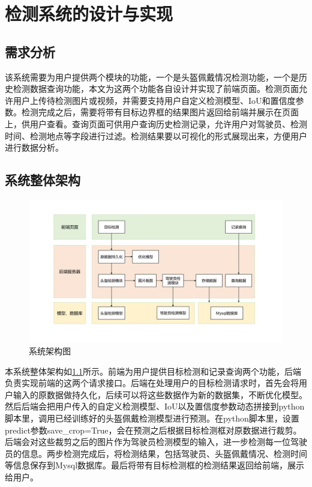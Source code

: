 \chapter{检测系统的设计与实现}

\section{需求分析}
该系统需要为用户提供两个模块的功能，一个是头盔佩戴情况检测功能，一个是历史检测数据查询功能，本文为这两个功能各自设计并实现了前端页面。检测页面允许用户上传待检测图片或视频，并需要支持用户自定义检测模型、IoU和置信度参数。检测完成之后，需要将带有目标边界框的结果图片返回给前端并展示在页面上，供用户查看。查询页面可供用户查询历史检测记录，允许用户对驾驶员、检测时间、检测地点等字段进行过滤。检测结果要以可视化的形式展现出来，方便用户进行数据分析。

\section{系统整体架构}
\begin{figure}[!htb]
    \centering
    \includegraphics[width=1\textwidth]{figs/chap05/struct.png}
    \caption{系统架构图}
    \label{fig:struct}
\end{figure}
本系统整体架构如\ref{fig:struct}所示。前端为用户提供目标检测和记录查询两个功能，后端负责实现前端的这两个请求接口。后端在处理用户的目标检测请求时，首先会将用户输入的原数据做持久化，后续可以将这些数据作为新的数据集，不断优化模型。然后后端会把用户传入的自定义检测模型、IoU以及置信度参数动态拼接到python脚本里，调用已经训练好的头盔佩戴检测模型进行预测。在python脚本里，设置predict参数save\_crop=True，会在预测之后根据目标检测框对原数据进行裁剪。后端会对这些裁剪之后的图片作为驾驶员检测模型的输入，进一步检测每一位驾驶员的信息。两步检测完成后，将检测结果，包括驾驶员、头盔佩戴情况、检测时间等信息保存到Mysql数据库。最后将带有目标检测框的检测结果返回给前端，展示给用户。

